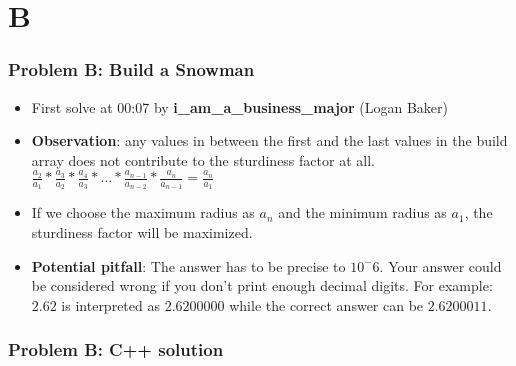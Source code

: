 \section{B}%
\label{sec:B}

\begin{frame}
  \frametitle{Problem B: Build a Snowman}
  \begin{itemize}
    \item First solve at 00:07 by \textbf{i\_am\_a\_business\_major} (Logan Baker)
    \item \textbf{Observation}: any values in between the first and the last values in the build array does not contribute to the sturdiness factor at all.\\
    $\frac{a_2}{a_1} * \frac{a_3}{a_2} * \frac{a_4}{a_3} * ... * \frac{a_{n-1}}{a_{n-2}} * \frac{a_n}{a_{n-1}} = \frac{a_n}{a_1}$
    \item If we choose the maximum radius as $a_n$ and the minimum radius as $a_1$, the sturdiness factor will be maximized.
    \item \textbf{Potential pitfall}: The answer has to be precise to $10^-6$. Your answer could be considered wrong if you don't print enough decimal digits. For example: $2.62$ is interpreted as $2.6200000$ while the correct answer can be $2.6200011$.
  \end{itemize}
\end{frame}


\begin{frame}
	\frametitle{Problem B: C++ solution}
\end{frame}

